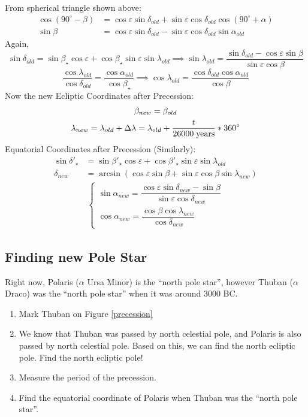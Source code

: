 \documentclass[a4paper,12pt]{extarticle}
\begin{document}
From spherical triangle shown above:
\begin{align*}
	\cos(90^\circ-\beta)&=\cos\varepsilon \sin\delta_{old}+\sin\varepsilon\cos\delta_{old}\cos(90^\circ+\alpha)\\
	\sin\beta&=\cos\varepsilon \sin\delta_{old}-\sin\varepsilon\cos\delta_{old}\sin\alpha_{old}
\end{align*}
Again, 
\[	\sin\delta_{old} =\sin \beta_\star \cos\varepsilon+\cos\beta_\star \sin\varepsilon \sin\lambda_{old} \implies \sin\lambda_{old}=\frac{\sin\delta_{old}-\cos\varepsilon \sin\beta}{\sin\varepsilon \cos\beta}\]
\[	\frac{\cos \lambda_{old} }{\cos \delta_{old}}=\frac{\cos\alpha_{old}}{\cos\beta_\star} \implies 
\cos\lambda_{old}=\frac{\cos\delta_{old}\cos\alpha_{old}}{\cos\beta}\]
Now the new Ecliptic Coordinates after Precession: 
   \begin{gather*}
	\beta_{new} =\beta_{old}\\
	\lambda_{new}=\lambda_{old}+\Delta \lambda= \lambda_{old}+\frac{t}{26000\;\rm years}\ast 360^\circ
\end{gather*}
Equatorial Coordinates after Precession (Similarly):
\begin{align*}
	\sin\delta'_\star&=\sin\beta'_\star\cos\varepsilon+\cos\beta'_\star \sin \varepsilon \sin\lambda_{old}\\		\delta_{new}&=\arcsin(\cos\varepsilon\sin\beta+\sin\varepsilon\cos\beta \sin\lambda_{new})
\end{align*}
\begin{gather*}
	\begin{cases}
		\sin\alpha_{new}=\dfrac{\cos\varepsilon\sin\delta_{new}-\sin\beta}{\sin\varepsilon\cos\delta_{new}}\\
		\cos\alpha_{new}=\dfrac{\cos\beta\cos\lambda_{new}}{\cos\delta_{new}}
	\end{cases}
\end{gather*}	



\subsection*{Finding new Pole Star}
Right now, Polaris ($\alpha$ Ursa Minor) is the ``north pole star'', however Thuban ($\alpha$ Draco) was the ``north pole star'' when it was around 3000 BC.

\begin{enumerate}[Q1.]
	\itemsep0em 
	\item Mark Thuban on Figure \ref{precession}
	\item We know that Thuban was passed by north celestial pole, and Polaris is also passed by north celestial pole. Based on this, we can find the north ecliptic pole. Find the north ecliptic pole!
	\item Measure the period of the precession.
	\item Find the equatorial coordinate of Polaris when Thuban was the ``north pole star''.
\end{enumerate}
\end{document}
